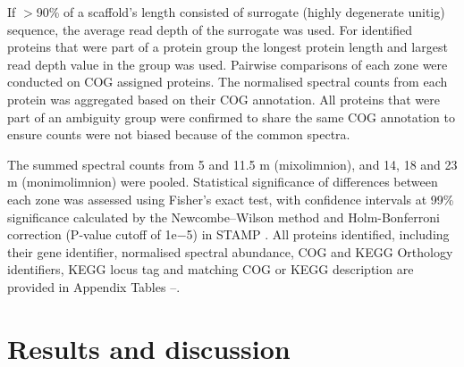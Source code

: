 If $>$90\% of a scaffold’s length consisted of surrogate (highly degenerate unitig) sequence, the average read depth of the surrogate was used. 
For identified proteins that were part of a protein group the longest protein length and largest read depth value in the group was used. 
Pairwise comparisons of each zone were conducted on \ac{COG} assigned proteins. 
The normalised spectral counts from each protein was aggregated based on their \ac{COG} annotation. 
All proteins that were part of an ambiguity group were confirmed to share the same \ac{COG} annotation to ensure counts were not biased because of the common spectra.

The summed spectral counts from 5 and 11.5 m (mixolimnion), and 14, 18 and 23 m (monimolimnion) were pooled. 
Statistical significance of differences between each zone was assessed using Fisher's exact test, with confidence intervals at 99\% significance calculated by the Newcombe–Wilson method and Holm-Bonferroni correction (P-value cutoff of 1e$-$5) in \ac{STAMP} \cite{Parks2010}. 
All proteins identified, including their gene identifier, normalised spectral abundance, \ac{COG} and \ac{KEGG} Orthology identifiers, \ac{KEGG} locus tag and matching \ac{COG} or \ac{KEGG} description are provided in Appendix Tables --.




\section{Results and discussion}

